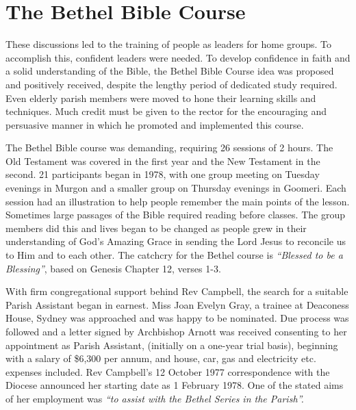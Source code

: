 \section{The Bethel Bible Course}



These discussions led to the training of people as leaders for home groups. To accomplish this, confident leaders were needed. To develop confidence in faith and a solid understanding of the Bible, the Bethel Bible Course idea was proposed and positively received, despite the lengthy period of dedicated study required. Even elderly parish members were moved to hone their learning skills and techniques. Much credit must be given to the rector for the encouraging and persuasive manner in which he promoted and implemented this course.



The Bethel Bible course was demanding, requiring 26 sessions of 2  hours. The Old Testament was covered in the first year and the New Testament in the second. 21 participants began in 1978, with one group meeting on Tuesday evenings in Murgon and a smaller group on Thursday evenings in Goomeri. Each session had an illustration to help people remember the main points of the lesson. Sometimes large passages of the Bible required reading before classes. The group members did this and lives began to be changed as people grew in their understanding of God's Amazing Grace in sending the Lord Jesus to reconcile us to Him and to each other. The catchcry for the Bethel course is \emph{``Blessed to be a Blessing''}, based on Genesis Chapter 12, verses 1-3.



With firm congregational support behind Rev Campbell, the search for a suitable Parish Assistant began in earnest. Miss Joan Evelyn Gray, a trainee at Deaconess House, Sydney was approached and was happy to be nominated. Due process was followed and a letter signed by Archbishop Arnott was received consenting to her appointment as Parish Assistant, (initially on a one-year trial basis), beginning with a salary of \$6,300 per annum, and house, car, gas and electricity etc. expenses included. Rev Campbell's 12 October 1977 correspondence with the Diocese announced her starting date as 1 February 1978. One of the stated aims of her employment was \emph{``to assist with the Bethel Series in the Parish''.}









